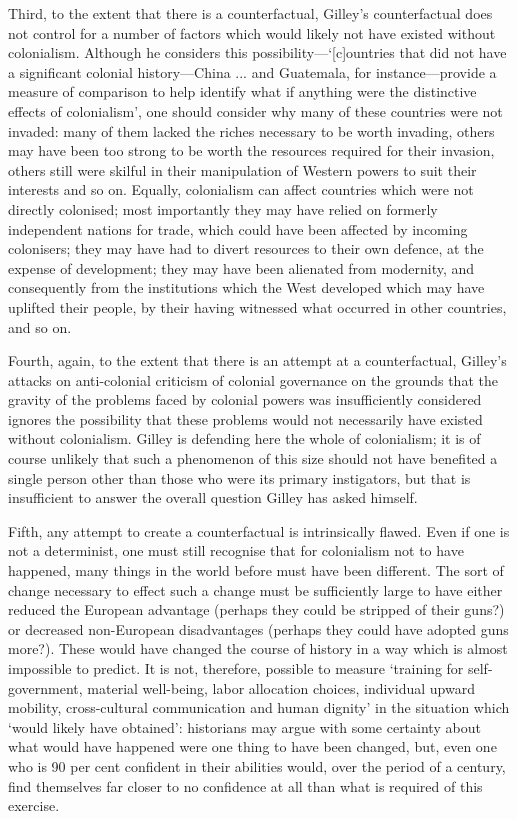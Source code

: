 \begin{multicols}{2}
Third, to the extent that there is a counterfactual, Gilley's counterfactual does not control for a number of factors which would likely not have existed without colonialism. Although he considers this possibility---`[c]ountries that did not have a significant colonial history---China ... and Guatemala, for instance---provide a measure of comparison to help identify what if anything were the distinctive effects of colonialism', one should consider why many of these countries were not invaded: many of them lacked the riches necessary to be worth invading, others may have been too strong to be worth the resources required for their invasion, others still were skilful in their manipulation of Western powers to suit their interests and so on. Equally, colonialism can affect countries which were not directly colonised; most importantly they may have relied on formerly independent nations for trade, which could have been affected by incoming colonisers; they may have had to divert resources to their own defence, at the expense of development; they may have been alienated from modernity, and consequently from the institutions which the West developed which may have uplifted their people, by their having witnessed what occurred in other countries, and so on.

Fourth, again, to the extent that there is an attempt at a counterfactual, Gilley's attacks on anti-colonial criticism of colonial governance on the grounds that the gravity of the problems faced by colonial powers was insufficiently considered ignores the possibility that these problems would not necessarily have existed without colonialism. Gilley is defending here the whole of colonialism; it is of course unlikely that such a phenomenon of this size should not have benefited a single person other than those who were its primary instigators, but that is insufficient to answer the overall question Gilley has asked himself.

Fifth, any attempt to create a counterfactual is intrinsically flawed. Even if one is not a determinist, one must still recognise that for colonialism not to have happened, many things in the world before must have been different. The sort of change necessary to effect such a change must be sufficiently large to have either reduced the European advantage (perhaps they could be stripped of their guns?) or decreased non-European disadvantages (perhaps they could have adopted guns more?). These would have changed the course of history in a way which is almost impossible to predict. It is not, therefore, possible to measure `training for self-government, material well-being, labor allocation choices, individual upward mobility, cross-cultural communication and human dignity' in the situation which `would likely have obtained': historians may argue with some certainty about what would have happened were one thing to have been changed, but, even one who is 90 per cent confident in their abilities would, over the period of a century, find themselves far closer to no confidence at all than what is required of this exercise. 


\end{multicols}
